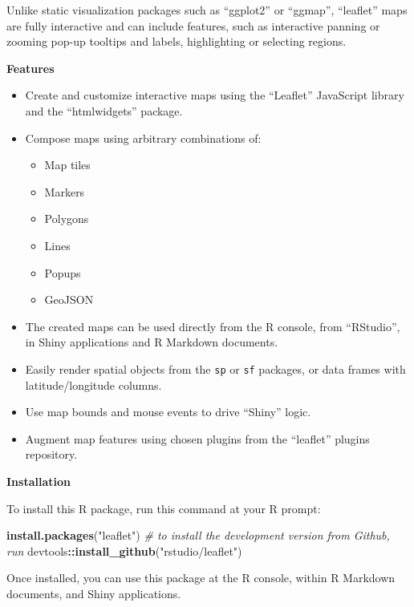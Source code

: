 \documentclass[]{book}
\newenvironment{Shaded}{\begin{snugshade}}{\end{snugshade}}
\newcommand{\KeywordTok}[1]{\textcolor[rgb]{0.13,0.29,0.53}{\textbf{#1}}}
\newcommand{\StringTok}[1]{\textcolor[rgb]{0.31,0.60,0.02}{#1}}
\newcommand{\CommentTok}[1]{\textcolor[rgb]{0.56,0.35,0.01}{\textit{#1}}}
\newcommand{\OperatorTok}[1]{\textcolor[rgb]{0.81,0.36,0.00}{\textbf{#1}}}
\newcommand{\NormalTok}[1]{#1}
\providecommand{\tightlist}{%
  \setlength{\itemsep}{0pt}\setlength{\parskip}{0pt}}
\begin{document}
Unlike static visualization packages such as ``ggplot2'' or ``ggmap'',
``leaflet'' maps are fully interactive and can include features, such as
interactive panning or zooming pop-up tooltips and labels, highlighting
or selecting regions.

\textbf{Features}

\begin{itemize}
\item
  Create and customize interactive maps using the ``Leaflet'' JavaScript
  library and the ``htmlwidgets'' package.
\item
  Compose maps using arbitrary combinations of:

  \begin{itemize}
  \tightlist
  \item
    Map tiles
  \item
    Markers
  \item
    Polygons
  \item
    Lines
  \item
    Popups
  \item
    GeoJSON
  \end{itemize}
\item
  The created maps can be used directly from the R console, from
  ``RStudio'', in Shiny applications and R Markdown documents.
\item
  Easily render spatial objects from the \texttt{sp} or \texttt{sf}
  packages, or data frames with latitude/longitude columns.
\item
  Use map bounds and mouse events to drive ``Shiny'' logic.
\item
  Augment map features using chosen plugins from the ``leaflet'' plugins
  repository.
\end{itemize}

\textbf{Installation}

To install this R package, run this command at your R prompt:

\begin{Shaded}
\begin{Highlighting}[]
\KeywordTok{install.packages}\NormalTok{(}\StringTok{"leaflet"}\NormalTok{)}
\CommentTok{# to install the development version from Github, run}
\NormalTok{devtools}\OperatorTok{::}\KeywordTok{install_github}\NormalTok{(}\StringTok{"rstudio/leaflet"}\NormalTok{)}
\end{Highlighting}
\end{Shaded}

Once installed, you can use this package at the R console, within R
Markdown documents, and Shiny applications.
\end{document}
